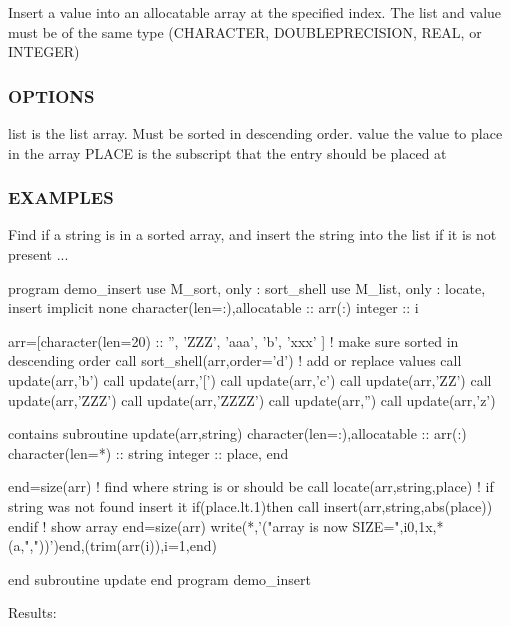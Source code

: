 \begin{DoxyVerb}Insert a value into an allocatable array at the specified index.
The list and value must be of the same type (CHARACTER, DOUBLEPRECISION,
REAL, or INTEGER)
\end{DoxyVerb}


\subsubsection*{O\+P\+T\+I\+O\+NS}

\begin{DoxyVerb}list    is the list array. Must be sorted in descending order.
value   the value to place in the array
PLACE   is the subscript that the entry should be placed at
\end{DoxyVerb}


\subsubsection*{E\+X\+A\+M\+P\+L\+ES}

\begin{DoxyVerb}Find if a string is in a sorted array, and insert the string into
the list if it is not present ...

 program demo_insert
 use M_sort, only : sort_shell
 use M_list, only : locate, insert
 implicit none
 character(len=:),allocatable :: arr(:)
 integer                       :: i

 arr=[character(len=20) :: '', 'ZZZ', 'aaa', 'b', 'xxx' ]
 ! make sure sorted in descending order
 call sort_shell(arr,order='d')
 ! add or replace values
 call update(arr,'b')
 call update(arr,'[')
 call update(arr,'c')
 call update(arr,'ZZ')
 call update(arr,'ZZZ')
 call update(arr,'ZZZZ')
 call update(arr,'')
 call update(arr,'z')

 contains
 subroutine update(arr,string)
 character(len=:),allocatable :: arr(:)
 character(len=*)             :: string
 integer                      :: place, end

 end=size(arr)
 ! find where string is or should be
 call locate(arr,string,place)
 ! if string was not found insert it
 if(place.lt.1)then
    call insert(arr,string,abs(place))
 endif
 ! show array
 end=size(arr)
 write(*,'("array is now SIZE=",i0,1x,*(a,","))')end,(trim(arr(i)),i=1,end)

 end subroutine update
 end program demo_insert
\end{DoxyVerb}


Results\+:

